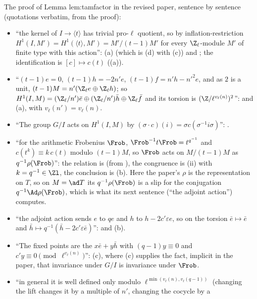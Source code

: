 \begin{paperlink}\label{pl:cohomology:tamfactor}
The proof of Lemma lem:tamfactor in the revised paper, sentence by sentence (quotations verbatim, from the proof):
\begin{itemize}
\item ``the kernel of $I\to\langle t\rangle$ has trivial pro-$\ell$ quotient, so by inflation-restriction $H^1(I,M')=H^1(\langle t\rangle,M')=M'/(t-1)M'$ for every
$\Z_\ell$-module $M'$ of finite type with this action'': (a) (which is (d) with
(c)) and ; the identification is $[c]\mapsto c(t)$ ((a)).
\item ``$(t-1)e=0$, $(t-1)h=-2n'e$, $(t-1)f=n'h-n'^2e$, and as $2$ is a unit, $(t-1)M=n'(\Z_\ell e\oplus\Z_\ell h)$; so
$H^1(I,M)=(\Z_\ell/n')\bar e\oplus(\Z_\ell/n')\bar h\oplus\Z_\ell\bar f$ and its torsion is $(\Z/\ell^{v_\ell(n)})^2$'':  and
(a), with $v_\ell(n')=v_\ell(n)$.
\item ``The group $G/I$ acts on $H^1(I,M)$ by $(\sigma\cdot c)(i)=\sigma c(\sigma^{-1}i\sigma)$'': .
\item ``for the arithmetic Frobenius $\Frob$, $\Frob^{-1}t\Frob=t^{q^{-1}}$ and $c(t^k)\equiv k\,c(t)$ modulo $(t-1)M$, so $\Frob$ acts on $M/(t-1)M$ as $q^{-1}\rho(\Frob)$'': the
relation is  (from ), the congruence is (ii) with $k=q^{-1}\in\Zl$, the conclusion is
(b). Here the paper's $\rho$ is the representation on $T$, so on $M=\ad T$ its $q^{-1}\rho(\Frob)$ is a slip for the conjugation
$q^{-1}\Ad\rho(\Frob)$, which is what its next sentence (``the adjoint action'') computes.
\item ``the adjoint action sends $e$ to $qe$ and $h$ to $h-2c'\varepsilon e$, so on the torsion $\bar e\mapsto\bar e$ and $\bar h\mapsto q^{-1}(\bar h-2c'\varepsilon\bar e)$'':
 and (b).
\item ``The fixed points are the $x\bar e+y\bar h$ with $(q-1)y\equiv0$ and $c'y\equiv0\pmod{\ell^{v_\ell(n)}}$'': (c), where
(c) supplies the fact, implicit in the paper, that invariance under $G/I$ is invariance under $\Frob$.
\item ``in general it is well defined only modulo $\ell^{\min(v_\ell(n),v_\ell(q-1))}$ (changing the lift changes it by a multiple of $n'$, changing the cocycle by a

\end{itemize}
\end{paperlink}

